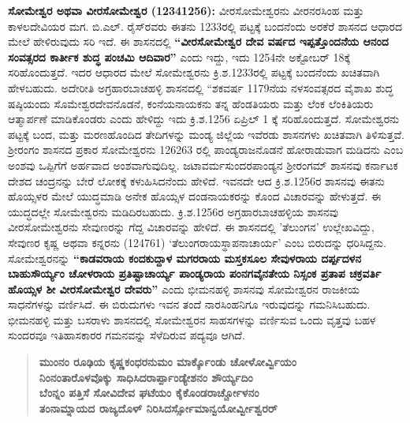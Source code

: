 \textbf{ಸೋಮೇಶ್ವರ ಅಥವಾ ವೀರಸೋಮೇಶ್ವರ (1234\general{\enginline{-}}1256):} ವೀರಸೋಮೇಶ್ವರನು ವೀರನರಸಿಂಹ ಮತ್ತು ಕಾಳಲದೇವಿಯರ ಮಗ. ಬಿ.ಎಲ್​. ರೈಸ್​ರವರು ಈತನು 1233ರಲ್ಲಿ ಪಟ್ಟಕ್ಕೆ ಬಂದನೆಂದು ಅರಕೆರೆ ಶಾಸನದ ಆಧಾರದ ಮೇಲೆ ಹೇಳಿರುವುದು ಸರಿ ಇದೆ. ಈ ಶಾಸನದಲ್ಲಿ \textbf{“ವೀರಸೋಮೇಶ್ವರ ದೇವ ವರ್ಷದ ಇಪ್ಪತ್ತೊಂದನೆಯ ಆನಂದ ಸಂವತ್ಸರದ ಕಾರ್ತೀಕ ಶುದ್ಧ ಪಂಚಮಿ ಆದಿವಾರ”} ಎಂದು ಇದ್ದು, ಇದು 1254ನೇ ಅಕ್ಟೋಬರ್​ 18ಕ್ಕೆ ಸರಿಹೊಂದುತ್ತದೆ. ಇದರ ಆಧಾರದ ಮೇಲೆ ಸೋಮೇಶ್ವರನು ಕ್ರಿ.ಶ.1233ರಲ್ಲಿ ಪಟ್ಟಕ್ಕೆ ಬಂದನೆಂದು ಖಚಿತವಾಗಿ ಹೇಳಬಹುದು. ಅದೇರೀತಿ ಅಗ್ರಹಾರಬಾಚಹಳ್ಳಿ ಶಾಸನದಲ್ಲಿ “ಶಕವರ್ಷ 1179ನೆಯ ನಳಸಂವತ್ಸರದ ವೈಶಾಖ ಶುದ್ಧ ಷಷ್ಠಿಯಂದು ಸೊಮೇಶ್ವರದೇವನೊಡನೆ, ಕಂನೆಯ\-ನಾಯಕನು ತನ್ನ ಹೆಂಡತಿಯರು ಮತ್ತು ಲೆಂಕ ಲೆಂಕಿತಿಯರು ಆತ್ಮಾರ್ಪಣೆ ಮಾಡಿಕೊಂಡರು ಎಂದು ಹೇಳಿದ್ದು ಇದು ಕ್ರಿ.ಶ.1256 ಏಪ್ರಿಲ್​ 1 ಕ್ಕೆ ಸರಿಹೊಂದುತ್ತದೆ. ಸೋಮೇಶ್ವರನು ಪಟ್ಟಕ್ಕೆ ಬಂದ, ಮತ್ತು ಮರಣಹೊಂದಿದ ತೇದಿಗಳನ್ನು ಮಂಡ್ಯ ಜಿಲ್ಲೆಯ ಇವೆರಡು ಶಾಸನಗಳು ಖಚಿತವಾಗಿ ತಿಳಿಸುತ್ತವೆ. ಶ‍್ರೀರಂಗಂ ಶಾಸನದ ಪ್ರಕಾರ ಸೋಮೇಶ್ವರನು 1262\enginline{-}63 ರಲ್ಲಿ ಪಾಂಡ್ಯರಾಜನೊಡನೆ ಹೋರಾಡುವಾಗ ಮಡಿದನು ಎಂಬ ಅಂಶವು ಒಪ್ಪಿಗೆಗೆ ಅರ್ಹವಾದ ಅಂಶವಾಗುವುದಿಲ್ಲ. ಜಟಾವರ್ಮಸುಂದರಪಾಂಡ್ಯನ ಶ‍್ರೀರಂಗಮ್ ಶಾಸನವು ಕರ್ನಾಟಕ ದೇಶದ ಚಂದ್ರನನ್ನು ಬೇರೆ ಲೋಕಕ್ಕೆ ಕಳುಹಿಸಿದನೆಂದು ಹೇಳಿದೆ. ಇವನದೇ ಆದ ಕ್ರಿ.ಶ.1256ರ ಶಾಸನವು ಈತನು ಹೊಯ್ಸಳರ ಮೇಲೆ ಯುದ್ಧಮಾಡಿ ಅನೇಕ ಹೊಯ್ಸಳ ದಂಡನಾಯಕರನ್ನು ಕೊಂದ ವಿಚಾರವನ್ನು ಹೇಳುತ್ತದೆ. ಈ ಯುದ್ಧದಲ್ಲೇ ಸೋಮೇಶ್ವರನು ಮಡಿದಿರಬಹುದು. ಕ್ರಿ.ಶ.1256ರ ಅಗ್ರಹಾರಬಾಚಹಳ್ಳಿಯ ಶಾಸನವು ವೀರಸೋಮೇಶ್ವರನು ಸೇವುಣರನ್ನು ಗೆದ್ದ ವಿಚಾರವನ್ನು ಹೇಳಿದೆ. ಈ ಶಾಸನದಲ್ಲಿ 'ತೆಲುಂಗನ' ಉಲ್ಲೇಖವಿದ್ದು, ಸೇವುಣರ ಕೃಷ್ಣ ಅಥವಾ ಕನ್ನರನು (1247\enginline{-}61) `ತೆಲುಂಗರಾಯಸ್ಥಾಪನಾಚಾರ್ಯ' ಎಂಬ ಬಿರುದನ್ನು ಧರಿಸಿದ್ದನು. ಸೋಮೇಶ್ವರನನ್ನು \textbf{“ಕಾಡವರಾಯ ಕಂದಕುದ್ದಾಳ ಮಗರರಾಯ ಮಸ್ತಕಸೂಲ ಸೇವುಳರಾಯ ದರ್ಪ್ಪದಳನ ಬಾಹುಸೌರ್ಯ್ಯಂ ಚೋಳರಾಯ ಪ್ರತಿಷ್ಟಾಚಾರ್ಯ್ಯ ಪಾಂಡ್ಯರಾಯ ಪಂನಗವೈನತೇಯ ನಿಸ್ಸಂಕ ಪ್ರತಾಪ ಚಕ್ರವರ್ತಿ ಹೊಯ್ಸಳ ಶೀ ವೀರಸೋಮೇಶ್ವರ ದೇವರು”} ಎಂದು ಭೀಮನಹಳ್ಳಿ ಶಾಸನವು ಸೋಮೇಶ್ವರನ ರಾಜಕೀಯ ಸಾಧನೆಗಳನ್ನು ವರ್ಣಿಸಿದೆ. ಈ ಬಿರುದುಗಳು ಇವನ ತಂದೆ ನಾರಸಿಂಹನಿಗೂ ಇರುವುದನ್ನು ಗಮನಿಸಿಬಹುದು. ಭೀಮನಹಳ್ಳಿ ಮತ್ತು ಬಸರಾಳು ಶಾಸನದಲ್ಲಿ ಸೋಮೇಶ್ವರನ ಸಾಹಸಗಳನ್ನು ವರ್ಣಿಸುವ ಒಂದು ವೃತ್ತವು ಬಹಳ ಸುಂದರವೂ ಇತಿಹಾಸಕಾರರ ಗಮನವನ್ನು ಸೆಳೆದಿರುವ ಪದ್ಯವೂ ಆಗಿದೆ.

\begin{verse}
\textbf{ಮುಂನಂ ರೂಢಿಯ ಕೃಷ್ಣಕಂಧರನುಮಂ ಮಾರ್ಕ್ಕೊಂಡು ಚೋಳೋರ್ವ್ವಿಯಂ} \\\textbf{ನಿಂನಂತಾರೊಳವೊಕ್ಕು ಸಾಧಿಸಿದರಾರ್ಪ್ಪಾಂಡ್ಯೇಶನಂ ಶೌರ್ಯ್ಯದಿಂ} \\\textbf{ಬೆಂನ್ನಂ ಪತ್ತಿಸೆ ಸೋವಿದೇವ ಘಟೆಯಂ ಕೈಕೊಂಡರಾರ್ಚ್ಚೋಳನಂ} \\\textbf{ತಂನಾಮ್ನಾಯದ ರಾಜ್ಯದೊಳ್​ ನಿರಿಸಿದರ್ಸ್ಸೋಮಾನ್ವಯೋರ್ವ್ವೀಶ್ವರರ್​}
\end{verse}

